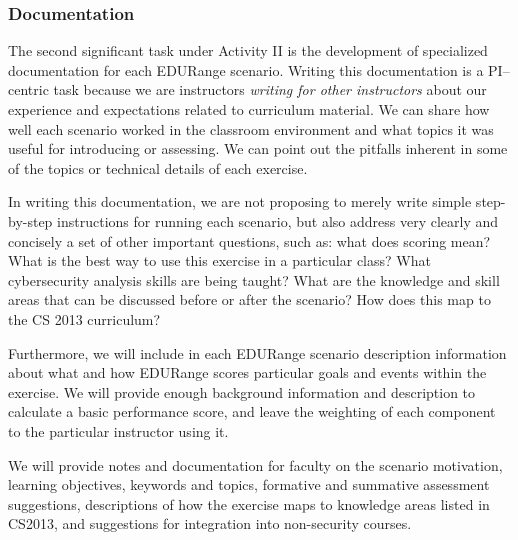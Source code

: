 
\subsubsection{Documentation}

The second significant task under Activity II is the development of
specialized documentation for each EDURange scenario.  Writing this
documentation is a PI--centric task because we are instructors {\em
  writing for other instructors} about our experience and expectations
related to curriculum material.  We can share how well each scenario
worked in the classroom environment and what topics it was useful for
introducing or assessing.  We can point out the pitfalls inherent in
some of the topics or technical details of each exercise.

In writing this documentation, we are not proposing to merely write
simple step-by-step instructions for running each scenario, but also
address very clearly and concisely a set of other important questions,
such as: what does scoring mean? What is the best way to use this
exercise in a particular class? What cybersecurity analysis skills are
being taught?  What are the knowledge and skill areas that can be
discussed before or after the scenario? How does this map to the CS
2013 curriculum?

Furthermore, we will include in each EDURange scenario description
information about what and how EDURange scores particular goals and
events within the exercise.  We will provide enough background
information and description to calculate a basic performance score,
and leave the weighting of each component to the particular instructor
using it.

We will provide notes and documentation for faculty on the scenario
motivation, learning objectives, keywords and topics, formative and
summative assessment suggestions, descriptions of how the exercise
maps to knowledge areas listed in CS2013, and suggestions for
integration into non-security courses.

